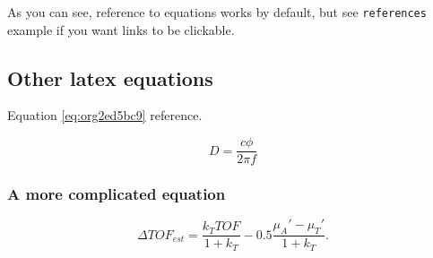 As you can see, reference to equations works by default, but see \texttt{references}
example if you want links to be clickable.

\subsection{Other latex equations}
\label{sec:org79af3b3}
Equation \ref{eq:org2ed5bc9} reference.

\begin{equation}
\label{eq:org2ed5bc9}
D = \frac{c\phi}{2\pi f}
\end{equation}

\subsubsection{A more complicated equation}
\label{sec:org0ced93f}

\begin{equation}
\Delta TOF_{est} = \frac{k_T TOF}{1+k_T } - 0.5 \frac{\mu_A' - \mu_T'}{1+k_T}.
\end{equation}


